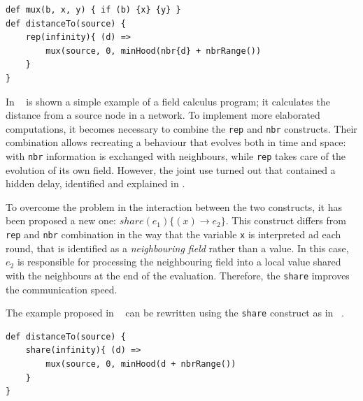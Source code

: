 \begin{lstlisting}[label={lst:field-calculus-program}, language=fieldCalculus, caption={The \texttt{rep} construct
establishes an initial distance estimate \textbf{d} set to infinity, which then diminishes based on two conditions.
If the source variable is \textbf{true}, indicating that the device is presently a \textbf{source}, its distance to
itself is considered zero.
Alternatively, if the device is not a \textbf{source}, the distance estimate is determined using the triangle inequality.
This involves computing the minimum value obtained by adding the distance to each neighbour (using the \texttt{nbrRange}
built-in function) to the neighbour field value (accessed via the $\texttt{nbr{d}}$ notation).
The \texttt{mux} function ensures that all arguments are evaluated prior to selection.}]
def mux(b, x, y) { if (b) {x} {y} }
def distanceTo(source) {
    rep(infinity){ (d) =>
        mux(source, 0, minHood(nbr{d} + nbrRange())
    }
}
\end{lstlisting}

In ~ is shown a simple example of a field calculus program; it calculates the distance
from a source node in a network.
To implement more elaborated computations, it becomes necessary to combine the \texttt{rep} and \texttt{nbr} constructs.
Their combination allows recreating a behaviour that evolves both in time and space: with \texttt{nbr} information is
exchanged with neighbours, while \texttt{rep} takes care of the evolution of its own field.
However, the joint use turned out that contained a hidden delay, identified and explained in \cite{fieldc}.

To overcome the problem in the interaction between the two constructs, it has been proposed a new one:
$share(e_1)\{(x) \rightarrow e_2\}$.
This construct differs from \texttt{rep} and \texttt{nbr} combination in the way that the variable \texttt{x} is
interpreted ad each round, that is identified as a \emph{neighbouring field} rather than a value.
In this case, $e_2$ is responsible for processing the neighbouring field into a local value shared with the
neighbours at the end of the evaluation.
Therefore, the \texttt{share} improves the communication speed.

The example proposed in ~ can be rewritten using the \texttt{share} construct as in ~.
\begin{lstlisting}[label={lst:field-calculus-program-share}, language=fieldCalculus, caption={The \texttt{share} construct
is used to calculate the distance from a source node in a network.}]
def distanceTo(source) {
    share(infinity){ (d) =>
        mux(source, 0, minHood(d + nbrRange())
    }
}
\end{lstlisting}

